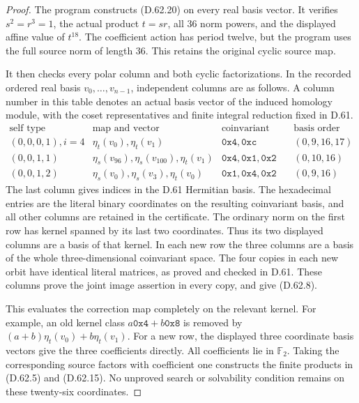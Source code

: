 \begin{proof}
The program
constructs (D.62.20) on every real
basis vector. It verifies
\(s^2=r^3=1\), the actual product
\(t=sr\), all 36 norm powers,
and the displayed affine value
of \(t^{18}\). The coefficient
action has period twelve, but
the program uses the full source
norm of length 36. This retains
the original cyclic source map.

It then checks every polar column
and both cyclic factorizations.
In the recorded ordered real basis
\(v_0,\ldots,v_{n-1}\), independent
columns are as follows. A column
number in this table denotes an
actual basis vector of the
induced homology module, with the
coset representatives and finite
integral reduction fixed in D.61.
\[
 \begin{array}{c|c|c|c}
 \text{self type}&\text{map and vector}
      &\text{coinvariant image}&\text{basis order}\\\hline
 (0,0,0,1),i=4&\eta_t(v_0),\eta_t(v_1)
      &\mathtt{0x4},\mathtt{0xc}&(0,9,16,17)\\
 (0,0,1,1)&\eta_s(v_{96}),\eta_s(v_{100}),\eta_t(v_1)
      &\mathtt{0x4},\mathtt{0x1},\mathtt{0x2}&(0,10,16)\\
 (0,0,1,2)&\eta_s(v_0),\eta_s(v_3),\eta_t(v_0)
      &\mathtt{0x1},\mathtt{0x4},\mathtt{0x2}&(0,9,16)
 \end{array}
 \tag{D.62.21}
\]
The last column gives indices in
the D.61 Hermitian basis. The
hexadecimal entries are the literal
binary coordinates on the resulting
coinvariant basis, and all other
columns are retained in the
certificate. The ordinary norm on
the first row has kernel spanned
by its last two coordinates.
Thus its two displayed columns
are a basis of that kernel.
In each new row the three columns
are a basis of the whole
three-dimensional coinvariant space.
The four copies in each new
orbit have identical literal
matrices, as proved and checked
in D.61. These columns prove the
joint image assertion in every
copy, and give (D.62.8).

This evaluates the correction
map completely on the relevant
kernel. For example, an old
kernel class \(a\mathtt{0x4}
+b\mathtt{0x8}\) is removed by
\((a+b)\eta_t(v_0)+b\eta_t(v_1)\).
For a new row, the displayed
three coordinate basis vectors
give the three coefficients
directly. All coefficients lie
in \(\mathbb F_2\). Taking the
corresponding source factors with
coefficient one constructs the
finite products in (D.62.5) and
(D.62.15). No unproved search
or solvability condition remains
on these twenty-six coordinates.


\end{proof}
